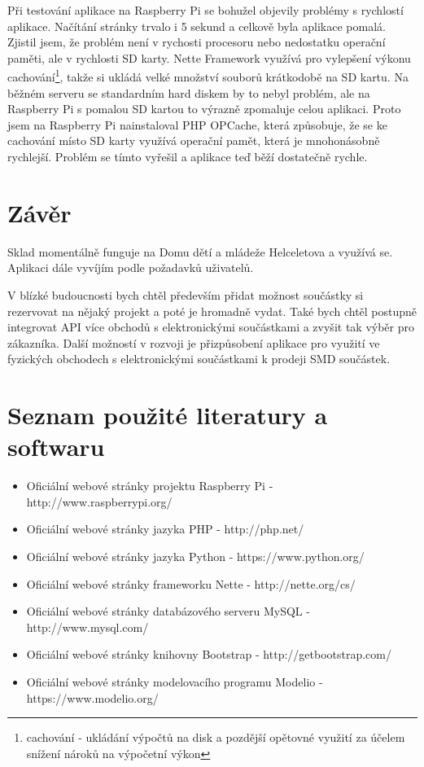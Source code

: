 \documentclass[12pt, a4paper, oneside]{article}
\begin{document}
Při testování aplikace na Raspberry Pi se bohužel objevily problémy s rychlostí aplikace. Načítání stránky trvalo i 5 sekund a celkově byla aplikace pomalá. Zjistil jsem, že problém není v rychosti procesoru nebo nedostatku operační paměti, ale v rychlosti SD karty. Nette Framework využívá pro vylepšení výkonu cachování\footnote{cachování - ukládání výpočtů na disk a pozdější opětovné využití za účelem snížení nároků na výpočetní výkon}, takže si ukládá velké množství souborů krátkodobě na SD kartu. Na běžném serveru se standardním hard diskem by to nebyl problém, ale na Raspberry Pi s pomalou SD kartou to výrazně zpomaluje celou aplikaci. Proto jsem na Raspberry Pi nainstaloval PHP OPCache, která způsobuje, že se ke cachování místo SD karty využívá operační pamět, která je mnohonásobně rychlejší. Problém se tímto vyřešil a aplikace teď běží dostatečně rychle.



\newpage

\section*{Závěr} %

Sklad momentálně funguje na Domu dětí a mládeže Helceletova a využívá se. Aplikaci dále vyvíjím podle požadavků uživatelů.

V blízké budoucnosti bych chtěl především přidat možnost součástky si rezervovat na nějaký projekt a poté je hromadně vydat. Také bych chtěl postupně integrovat API více obchodů s elektronickými součástkami a zvyšit tak výběr pro zákazníka. Další možností v rozvoji je přizpůsobení aplikace pro využití ve fyzických obchodech s elektronickými součástkami k prodeji SMD součástek.


\newpage

\section*{Seznam použité literatury a softwaru}

\begin{itemize}
\item Oficiální webové stránky projektu Raspberry Pi - http://www.raspberrypi.org/
\item Oficiální webové stránky jazyka PHP - http://php.net/
\item Oficiální webové stránky jazyka Python - https://www.python.org/
\item Oficiální webové stránky frameworku Nette - http://nette.org/cs/
\item Oficiální webové stránky databázového serveru MySQL - http://www.mysql.com/
\item Oficiální webové stránky knihovny Bootstrap - http://getbootstrap.com/
\item Oficiální webové stránky modelovacího programu Modelio - https://www.modelio.org/
\end{itemize}
\end{document}
